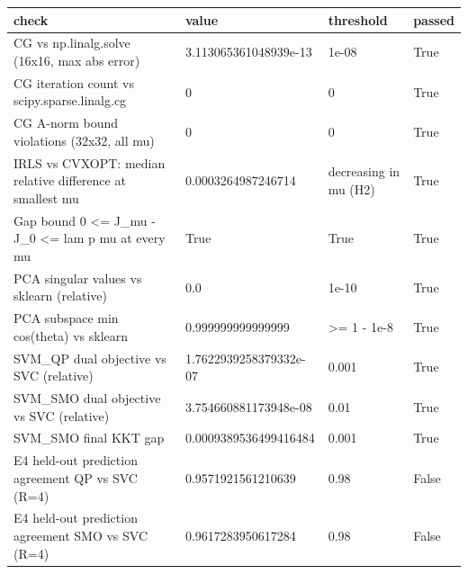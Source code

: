 \begin{tabular}{llll}
\hline
check & value & threshold & passed \\
\hline
CG vs np.linalg.solve (16x16, max abs error) & 3.113065361048939e-13 & 1e-08 & True \\
CG iteration count vs scipy.sparse.linalg.cg & 0 & 0 & True \\
CG A-norm bound violations (32x32, all mu) & 0 & 0 & True \\
IRLS vs CVXOPT: median relative difference at smallest mu & 0.0003264987246714 & decreasing in mu (H2) & True \\
Gap bound 0 <= J\_mu - J\_0 <= lam p mu at every mu & True & True & True \\
PCA singular values vs sklearn (relative) & 0.0 & 1e-10 & True \\
PCA subspace min cos(theta) vs sklearn & 0.999999999999999 & >= 1 - 1e-8 & True \\
SVM\_QP dual objective vs SVC (relative) & 1.7622939258379332e-07 & 0.001 & True \\
SVM\_SMO dual objective vs SVC (relative) & 3.754660881173948e-08 & 0.01 & True \\
SVM\_SMO final KKT gap & 0.0009389536499416484 & 0.001 & True \\
E4 held-out prediction agreement QP vs SVC (R=4) & 0.9571921561210639 & 0.98 & False \\
E4 held-out prediction agreement SMO vs SVC (R=4) & 0.9617283950617284 & 0.98 & False \\
\hline
\end{tabular}
